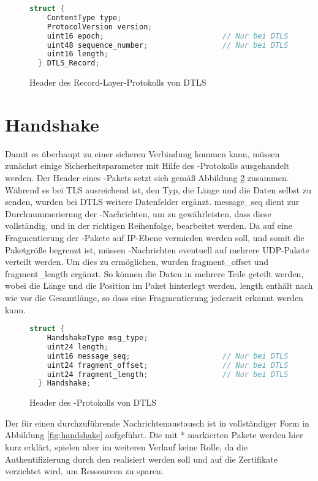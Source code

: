\begin{figure}[ht]
  \centering
  \begin{lstlisting}[language=c]
  struct {
    ContentType type;
    ProtocolVersion version;
    uint16 epoch;                           // Nur bei DTLS
    uint48 sequence_number;                 // Nur bei DTLS
    uint16 length;
  } DTLS_Record;
  \end{lstlisting}
  \caption{Header des Record-Layer-Protokolls von DTLS}
  \label{fig:recordlayer}
\end{figure}

\section{Handshake}

Damit es überhaupt zu einer sicheren Verbindung kommen kann, müssen zunächst einige Sicherheitsparameter mit Hilfe des -Protokolls ausgehandelt werden.
Der Header eines -Pakets setzt sich gemäß Abbildung \ref{fig:handshakelayer} zusammen. Während es bei TLS ausreichend ist, den Typ, die Länge und die Daten selbst
zu senden, wurden bei DTLS weitere Datenfelder ergänzt. message\_seq dient zur Durchnummerierung der -Nachrichten, um zu gewährleisten, dass diese vollständig,
und in der richtigen Reihenfolge, bearbeitet werden. Da auf eine Fragmentierung der -Pakete auf IP-Ebene vermieden werden soll, und somit die Paketgröße begrenzt ist,
müssen -Nachrichten eventuell auf mehrere UDP-Pakete verteilt werden. Um dies zu ermöglichen, wurden fragment\_offset und fragment\_length
ergänzt. So können die Daten in mehrere Teile geteilt werden, wobei die Länge und die Position im Paket hinterlegt werden. length enthält nach wie vor die
Gesamtlänge, so dass eine Fragmentierung jederzeit erkannt werden kann.

\begin{figure}[ht]
  \centering
  \begin{lstlisting}[language=c]
  struct {
    HandshakeType msg_type;
    uint24 length;
    uint16 message_seq;                     // Nur bei DTLS
    uint24 fragment_offset;                 // Nur bei DTLS
    uint24 fragment_length;                 // Nur bei DTLS
  } Handshake;
  \end{lstlisting}
  \caption{Header des -Protokolls von DTLS}
  \label{fig:handshakelayer}
\end{figure}

Der für einen  durchzuführende Nachrichtenaustausch ist in vollständiger Form in Abbildung \ref{fig:handshake} aufgeführt.
Die mit * markierten Pakete werden hier kurz erklärt, spielen aber im weiteren Verlauf keine Rolle, da die Authentifizierung durch
den  realisiert werden soll und auf die Zertifikate verzichtet wird, um Ressourcen zu sparen.

